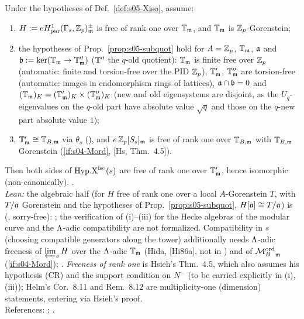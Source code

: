 \begin{proposition}\label{prop:s05-Xiso}
Under the hypotheses of Def.~\ref{def:s05-Xiso}, assume:
\begin{enumerate}[label=(\roman*)]
\item $H:=eH^1_{\rm par}(\Gamma_s,\mathbb{Z}_p)^{\pm}_{\mathfrak{m}}$ is free of rank one over $\mathbb{T}_{\mathfrak{m}}$, and $\mathbb{T}_{\mathfrak{m}}$ is $\mathbb{Z}_p$-Gorenstein;
\item the hypotheses of Prop.~\ref{prop:s05-subquot} hold for $A=\mathbb{Z}_p$, $\mathbb{T}_{\mathfrak{m}}$, $\mathfrak{a}$ and $\mathfrak{b}:=\ker(\mathbb{T}_{\mathfrak{m}}\to\mathbb{T}''_{\mathfrak{m}})$ ($\mathbb{T}''$ the $q$-old
  quotient): $\mathbb{T}_{\mathfrak{m}}$ is finite free over $\mathbb{Z}_p$ (automatic: finite and torsion-free over the PID $\mathbb{Z}_p$), $\mathbb{T}'_{\mathfrak{m}}$, $\mathbb{T}''_{\mathfrak{m}}$ are torsion-free
  (automatic: images in endomorphism rings of lattices), $\mathfrak{a}\cap\mathfrak{b}=0$ and $(\mathbb{T}_{\mathfrak{m}})_K=(\mathbb{T}'_{\mathfrak{m}})_K\times(\mathbb{T}''_{\mathfrak{m}})_K$ (new and old
  eigensystems are disjoint, as the $U_q$-eigenvalues on the $q$-old part have absolute value $\sqrt q$ and those on the $q$-new part
  absolute value $1$);
\item $\mathbb{T}'_{\mathfrak{m}}\cong\mathbb{T}_{B,\mathfrak{m}}$ via $\theta_s$ (), and $e\,\mathbb{Z}_p[S_s]_{\mathfrak{m}}$ is free of rank one over $\mathbb{T}_{B,\mathfrak{m}}$ with
  $\mathbb{T}_{B,\mathfrak{m}}$ Gorenstein (\ref{if:s04-Mord}, [Hs, Thm.~4.5]).
\end{enumerate}
Then both sides of $\mathrm{Hyp.X}^{\mathrm{iso}}(s)$ are free of rank one over $\mathbb{T}'_{\mathfrak{m}}$, hence isomorphic (non-canonically). \stpmc.\\\emph{Lean:} the algebraic half (for $H$ free of rank one over a local $A$-Gorenstein $T$, with $T/\mathfrak{a}$ Gorenstein and the hypotheses of Prop.~\ref{prop:s05-subquot}, $H[\mathfrak{a}]\cong T/\mathfrak{a}$) is \stformal{} (, sorry-free): ; the verification of (i)--(iii) for the Hecke algebras of the modular curve and the $\Lambda$-adic compatibility are not formalized.
Compatibility in $s$ (choosing compatible generators along the tower) additionally needs $\Lambda$-adic freeness of $\varprojlim_sH$ over
the $\Lambda$-adic $\mathbb{T}_{\mathfrak{m}}$ (Hida, [Hi86a], not in ) and of ${\mathcal{M}^{\mathrm{ord}}_B}_{\mathfrak{m}}$ (\ref{if:s04-Mord}); \stsketch.
\emph{Freeness of rank one} is Hsieh's Thm.~4.5, which also assumes his hypothesis (CR) and the support condition on $N^-$ (to be carried explicitly in (i), (iii)); Helm's Cor.~8.11 and Rem.~8.12 are multiplicity-one (dimension) statements, entering via Hsieh's proof.\\
References: ;
.
\end{proposition}
